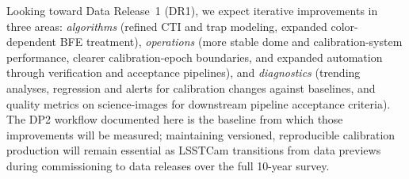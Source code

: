 Looking toward Data Release~1 (DR1), we expect iterative improvements in three areas: \emph{algorithms} (refined CTI and trap modeling, expanded color-dependent BFE treatment), \emph{operations} (more stable dome and calibration-system performance, clearer calibration-epoch boundaries, and expanded automation through verification and acceptance pipelines), and \emph{diagnostics} (trending analyses, regression and alerts for calibration changes against baselines, and quality metrics on science-images for downstream pipeline acceptance criteria).
The DP2 workflow documented here is the baseline from which those improvements will be measured; maintaining versioned, reproducible calibration production will remain essential as LSSTCam transitions from data previews during commissioning to data releases over the full 10-year survey.

\vskip 0.4in
